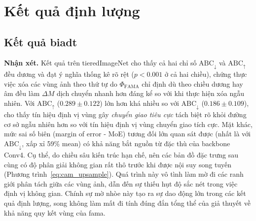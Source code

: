 \section{Kết quả định lượng}
\label{sec:quant_results}

\subsection{Kết quả \acrshort{biadt}}
\label{subsec:biadt_results}

\begin{table}[H]
\centering
\caption{Kết quả \acrshort{biadt}: $\mathrm{ABC}_\downarrow$ và $\mathrm{ABC}_\uparrow$ trên bộ dữ liệu \emph{TieredImagenet}}
\label{tab:biadt_results}
\end{table}

\textbf{Nhận xét.} Kết quả trên tieredImageNet cho thấy cả hai chỉ số $\mathrm{ABC}_\downarrow$ và $\mathrm{ABC}_\uparrow$ đều dương và đạt ý nghĩa thống kê rõ rệt ($p<0.001$ ở cả hai chiều), chứng thực việc xóa các vùng ảnh theo thứ tự do $\Phi_{\text{FAMA}}$ chỉ định dù theo chiều dương hay âm đều làm $\Delta M$ dịch chuyển nhanh hơn đáng kể so với khi thực hiện xóa ngẫu nhiên. Với $\mathrm{ABC}_\uparrow$ ($0.289 \pm 0.122$) lớn hơn khá nhiều so với $\mathrm{ABC}_\downarrow$ ($0.186 \pm 0.109$), cho thấy tín hiệu định vị vùng gây \emph{chuyển giao tiêu cực} tách biệt rõ khỏi đường cơ sở ngẫu nhiên hơn so với tín hiệu định vị vùng chuyển giao tích cực. Mặt khác, mức sai số biên (margin of error - MoE) tương đối lớn quan sát được (nhất là với $\mathrm{ABC}_\downarrow$, xấp xỉ 59\% mean) có khả năng bắt nguồn từ đặc thù của backbone Conv4. Cụ thể, do chiều sâu kiến trúc hạn chế, nên các bản đồ đặc trưng sau cùng có độ phân giải không gian rất thô trước khi được nội suy song tuyến (Phương trình~\eqref{eq:cam_upsample}). Quá trình này vô tình làm mờ đi các ranh giới phân tách giữa các vùng ảnh, dẫn đến sự thiếu hụt độ sắc nét trong việc định vị không gian. Chính sự mờ nhòe này tạo ra sự dao động lớn trong các kết quả định lượng, song không làm mất đi tính đúng đắn tổng thể của giả thuyết về khả năng quy kết vùng của \acrshort{fama}.

